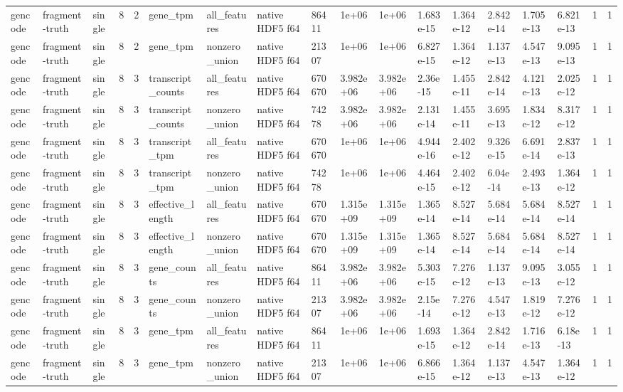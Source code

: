 \begin{tabular}{llllllllllllllllll}
gencode & fragment-truth & single & 8 & 2 & gene\_tpm & all\_features & native HDF5 f64 & 86411 & 1e+06 & 1e+06 & 1.683e-15 & 1.364e-12 & 2.842e-14 & 1.705e-13 & 6.821e-13 & 1 & 1 \\
gencode & fragment-truth & single & 8 & 2 & gene\_tpm & nonzero\_union & native HDF5 f64 & 21307 & 1e+06 & 1e+06 & 6.827e-15 & 1.364e-12 & 1.137e-13 & 4.547e-13 & 9.095e-13 & 1 & 1 \\
gencode & fragment-truth & single & 8 & 3 & transcript\_counts & all\_features & native HDF5 f64 & 670670 & 3.982e+06 & 3.982e+06 & 2.36e-15 & 1.455e-11 & 2.842e-14 & 4.121e-13 & 2.025e-12 & 1 & 1 \\
gencode & fragment-truth & single & 8 & 3 & transcript\_counts & nonzero\_union & native HDF5 f64 & 74278 & 3.982e+06 & 3.982e+06 & 2.131e-14 & 1.455e-11 & 3.695e-13 & 1.834e-12 & 8.317e-12 & 1 & 1 \\
gencode & fragment-truth & single & 8 & 3 & transcript\_tpm & all\_features & native HDF5 f64 & 670670 & 1e+06 & 1e+06 & 4.944e-16 & 2.402e-12 & 9.326e-15 & 6.691e-14 & 2.837e-13 & 1 & 1 \\
gencode & fragment-truth & single & 8 & 3 & transcript\_tpm & nonzero\_union & native HDF5 f64 & 74278 & 1e+06 & 1e+06 & 4.464e-15 & 2.402e-12 & 6.04e-14 & 2.493e-13 & 1.364e-12 & 1 & 1 \\
gencode & fragment-truth & single & 8 & 3 & effective\_length & all\_features & native HDF5 f64 & 670670 & 1.315e+09 & 1.315e+09 & 1.365e-14 & 8.527e-14 & 5.684e-14 & 5.684e-14 & 8.527e-14 & 1 & 1 \\
gencode & fragment-truth & single & 8 & 3 & effective\_length & nonzero\_union & native HDF5 f64 & 670670 & 1.315e+09 & 1.315e+09 & 1.365e-14 & 8.527e-14 & 5.684e-14 & 5.684e-14 & 8.527e-14 & 1 & 1 \\
gencode & fragment-truth & single & 8 & 3 & gene\_counts & all\_features & native HDF5 f64 & 86411 & 3.982e+06 & 3.982e+06 & 5.303e-15 & 7.276e-12 & 1.137e-13 & 9.095e-13 & 3.055e-12 & 1 & 1 \\
gencode & fragment-truth & single & 8 & 3 & gene\_counts & nonzero\_union & native HDF5 f64 & 21307 & 3.982e+06 & 3.982e+06 & 2.15e-14 & 7.276e-12 & 4.547e-13 & 1.819e-12 & 7.276e-12 & 1 & 1 \\
gencode & fragment-truth & single & 8 & 3 & gene\_tpm & all\_features & native HDF5 f64 & 86411 & 1e+06 & 1e+06 & 1.693e-15 & 1.364e-12 & 2.842e-14 & 1.716e-13 & 6.18e-13 & 1 & 1 \\
gencode & fragment-truth & single & 8 & 3 & gene\_tpm & nonzero\_union & native HDF5 f64 & 21307 & 1e+06 & 1e+06 & 6.866e-15 & 1.364e-12 & 1.137e-13 & 4.547e-13 & 1.364e-12 & 1 & 1 \\

\end{tabular}
